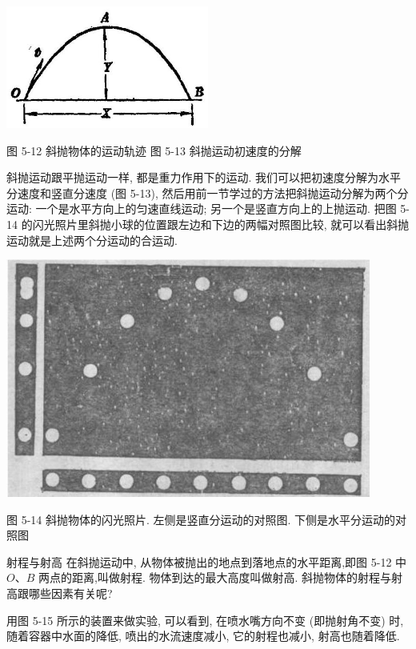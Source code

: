 \documentclass[10pt]{article}
\begin{document}
\begin{center}
\includegraphics[max width=0.5\textwidth]{images/01912d55-147c-70aa-b0e0-1782a122f948_138_841584.jpg}
\end{center}

图 5-12 斜抛物体的运动轨迹 图 5-13 斜抛运动初速度的分解

斜抛运动跟平抛运动一样, 都是重力作用下的运动. 我们可以把初速度分解为水平分速度和竖直分速度 (图 5-13), 然后用前一节学过的方法把斜抛运动分解为两个分运动: 一个是水平方向上的匀速直线运动; 另一个是竖直方向上的上抛运动. 把图 5-14 的闪光照片里斜抛小球的位置跟左边和下边的两幅对照图比较, 就可以看出斜抛运动就是上述两个分运动的合运动.

\begin{center}
\includegraphics[max width=0.9\textwidth]{images/01912d55-147c-70aa-b0e0-1782a122f948_139_386795.jpg}
\end{center}

图 5-14 斜抛物体的闪光照片. 左侧是竖直分运动的对照图. 下侧是水平分运动的对照图

射程与射高 在斜抛运动中, 从物体被抛出的地点到落地点的水平距离,即图 5-12 中 \(O\text{、}B\) 两点的距离,叫做射程. 物体到达的最大高度叫做射高. 斜抛物体的射程与射高跟哪些因素有关呢?

用图 5-15 所示的装置来做实验, 可以看到, 在喷水嘴方向不变 (即抛射角不变) 时, 随着容器中水面的降低, 喷出的水流速度减小, 它的射程也减小, 射高也随着降低.
\end{document}
